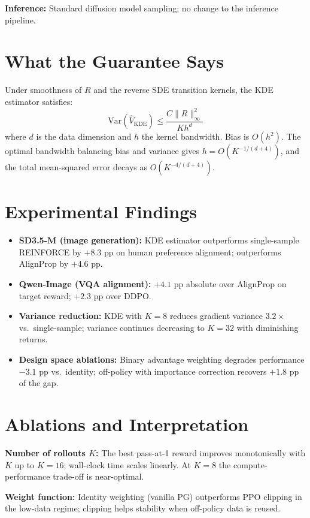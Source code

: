 \documentclass[10pt,twocolumn]{article}
\begin{document}
\textbf{Inference:} Standard diffusion model sampling; no change to the
inference pipeline.

\section{What the Guarantee Says}

Under smoothness of $R$ and the reverse SDE transition kernels, the
KDE estimator satisfies:
\[
  \text{Var}(\hat{V}_\text{KDE}) \leq \frac{C \|R\|_\infty^2}{K h^d}
\]
where $d$ is the data dimension and $h$ the kernel bandwidth. Bias
is $O(h^2)$. The optimal bandwidth balancing bias and variance gives
$h = O(K^{-1/(d+4)})$, and the total mean-squared error decays as
$O(K^{-4/(d+4)})$.

\section{Experimental Findings}

\begin{itemize}[itemsep=2pt,parsep=0pt]
  \item \textbf{SD3.5-M (image generation):} KDE estimator outperforms
    single-sample REINFORCE by $+8.3$ pp on human preference alignment;
    outperforms AlignProp by $+4.6$ pp.
  \item \textbf{Qwen-Image (VQA alignment):} $+4.1$ pp absolute over
    AlignProp on target reward; $+2.3$ pp over DDPO.
  \item \textbf{Variance reduction:} KDE with $K=8$ reduces gradient
    variance $3.2\times$ vs.\ single-sample; variance continues
    decreasing to $K=32$ with diminishing returns.
  \item \textbf{Design space ablations:} Binary advantage weighting
    degrades performance $-3.1$ pp vs.\ identity; off-policy with
    importance correction recovers $+1.8$ pp of the gap.
\end{itemize}

\section{Ablations and Interpretation}

\textbf{Number of rollouts $K$:} The best pass-at-1 reward improves
monotonically with $K$ up to $K=16$; wall-clock time scales linearly.
At $K=8$ the compute-performance trade-off is near-optimal.

\textbf{Weight function:} Identity weighting (vanilla PG) outperforms
PPO clipping in the low-data regime; clipping helps stability when
off-policy data is reused.
\end{document}
